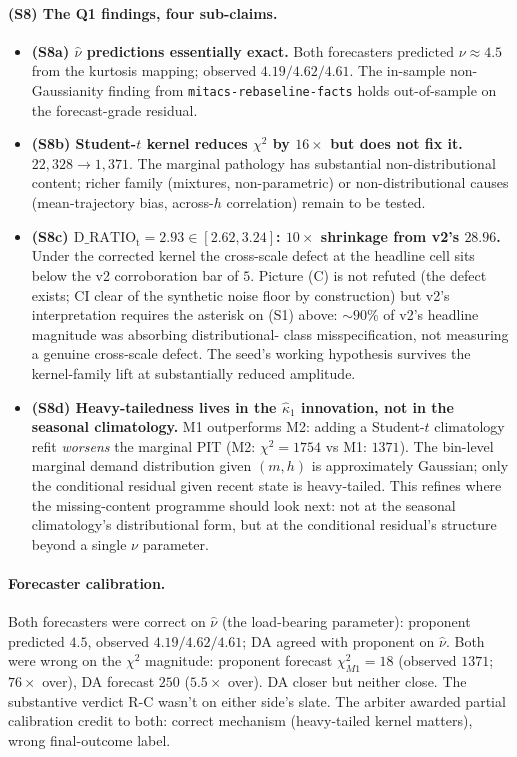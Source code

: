 \documentclass[11pt]{article}
\newcommand{\Studt}{\mathrm{t}}
\theoremstyle{definition}
\theoremstyle{plain}
\begin{document}
\paragraph{(S8) The Q1 findings, four sub-claims.}
\begin{itemize}[leftmargin=2em]
\item \textbf{(S8a) $\hat\nu$ predictions essentially exact.}
Both forecasters predicted $\nu \approx 4.5$ from the kurtosis
mapping; observed $4.19/4.62/4.61$. The in-sample non-Gaussianity
finding from \texttt{mitacs-rebaseline-facts} holds out-of-sample
on the forecast-grade residual.

\item \textbf{(S8b) Student-$t$ kernel reduces $\chi^{2}$ by $16\times$
but does not fix it.} $22{,}328 \to 1{,}371$. The marginal pathology
has substantial non-distributional content; richer family (mixtures,
non-parametric) or non-distributional causes (mean-trajectory bias,
across-$h$ correlation) remain to be tested.

\item \textbf{(S8c) $\mathrm{D\_RATIO}_{\Studt} = 2.93 \in [2.62,
3.24]$: $10\times$ shrinkage from v2's $28.96$.} Under the corrected
kernel the cross-scale defect at the headline cell sits below the
v2 corroboration bar of $5$. Picture (C) is not refuted (the defect
exists; CI clear of the synthetic noise floor by construction) but
v2's interpretation requires the asterisk on (S1) above:
$\sim 90\%$ of v2's headline magnitude was absorbing distributional-
class misspecification, not measuring a genuine cross-scale defect.
The seed's working hypothesis survives the kernel-family lift at
substantially reduced amplitude.

\item \textbf{(S8d) Heavy-tailedness lives in the $\hat\kappa_1$
innovation, not in the seasonal climatology.} M1 outperforms M2:
adding a Student-$t$ climatology refit \emph{worsens} the marginal
PIT (M2: $\chi^{2} = 1754$ vs M1: $1371$). The bin-level marginal
demand distribution given $(m, h)$ is approximately Gaussian; only
the conditional residual given recent state is heavy-tailed. This
refines where the missing-content programme should look next: not at
the seasonal climatology's distributional form, but at the
conditional residual's structure beyond a single $\nu$ parameter.
\end{itemize}

\paragraph{Forecaster calibration.}
Both forecasters were correct on $\hat\nu$ (the load-bearing
parameter): proponent predicted $4.5$, observed $4.19/4.62/4.61$;
DA agreed with proponent on $\hat\nu$. Both were wrong on the
$\chi^{2}$ magnitude: proponent forecast $\chi^{2}_{M1} = 18$
(observed $1371$; $76\times$ over), DA forecast $250$ ($5.5\times$
over). DA closer but neither close. The substantive verdict R-C
wasn't on either side's slate. The arbiter awarded partial
calibration credit to both: correct mechanism (heavy-tailed kernel
matters), wrong final-outcome label.
\end{document}

